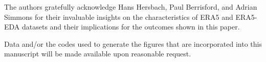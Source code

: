 \documentclass{ametsocV6.1}
\begin{document}
\acknowledgments
The authors gratefully acknowledge Hans Hersbach, Paul Berrisford, and Adrian Simmons for their invaluable insights on the characteristics of ERA5 and ERA5-EDA datasets and their implications for the outcomes shown in this paper. 


\datastatement
Data and/or the codes used to generate the figures that are incorporated into this manuscript will be made available upon reasonable request.




\end{document}
